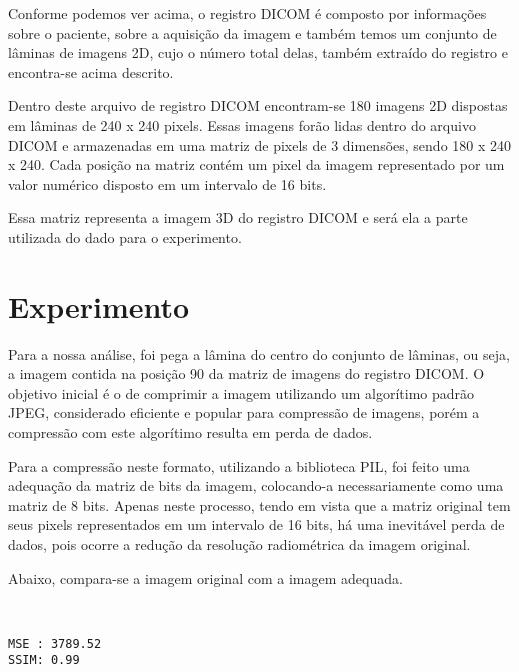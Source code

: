 \documentclass{IEEEtran}
\begin{document}
    Conforme podemos ver acima, o registro DICOM é composto por informações
sobre o paciente, sobre a aquisição da imagem e também temos um conjunto
de lâminas de imagens 2D, cujo o número total delas, também extraído do
registro e encontra-se acima descrito.

Dentro deste arquivo de registro DICOM encontram-se 180 imagens 2D
dispostas em lâminas de 240 x 240 pixels. Essas imagens forão lidas
dentro do arquivo DICOM e armazenadas em uma matriz de pixels de 3
dimensões, sendo 180 x 240 x 240. Cada posição na matriz contém um pixel
da imagem representado por um valor numérico disposto em um intervalo de
16 bits.

Essa matriz representa a imagem 3D do registro DICOM e será ela a parte
utilizada do dado para o experimento.

    \section{Experimento}\label{experimento}

    Para a nossa análise, foi pega a lâmina do centro do conjunto de
lâminas, ou seja, a imagem contida na posição 90 da matriz de imagens do
registro DICOM. O objetivo inicial é o de comprimir a imagem utilizando
um algorítimo padrão JPEG, considerado eficiente e popular para
compressão de imagens, porém a compressão com este algorítimo resulta em
perda de dados. 


    Para a compressão neste formato, utilizando a biblioteca PIL, foi feito
uma adequação da matriz de bits da imagem, colocando-a necessariamente
como uma matriz de 8 bits. Apenas neste processo, tendo em vista que a
matriz original tem seus pixels representados em um intervalo de 16
bits, há uma inevitável perda de dados, pois ocorre a redução da
resolução radiométrica da imagem original.

Abaixo, compara-se a imagem original com a imagem adequada.


    \begin{center}
    \end{center}
    { \hspace*{\fill} \\}
    
    \begin{Verbatim}[commandchars=\\\{\}]
MSE : 3789.52
SSIM: 0.99

    \end{Verbatim}
\end{document}
